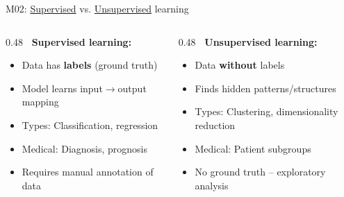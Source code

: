 \documentclass[aspectratio=169, 10pt]{beamer}
\begin{document}
\begin{frame}{M02: \href{https://en.wikipedia.org/wiki/Supervised_learning}{Supervised} vs. \href{https://en.wikipedia.org/wiki/Unsupervised_learning}{Unsupervised} learning}

    \begin{columns}
        \begin{column}{0.48\textwidth}
            \textbf{\faCheckCircle\ Supervised learning:}
            \begin{itemize}
                \item Data has \textbf{labels} (ground truth)
                \item Model learns input$\rightarrow$output mapping
                \item Types: Classification, regression
                \item Medical: Diagnosis, prognosis
                \item Requires manual annotation of data
            \end{itemize}
        \end{column}

        \begin{column}{0.48\textwidth}
            \textbf{\faSearch\ Unsupervised learning:}
            \begin{itemize}
                \item Data \textbf{without} labels
                \item Finds hidden patterns/structures
                \item Types: Clustering, dimensionality reduction
                \item Medical: Patient subgroups
                \item No ground truth -- exploratory analysis
            \end{itemize}
        \end{column}
    \end{columns}


\end{frame}
\end{document}

